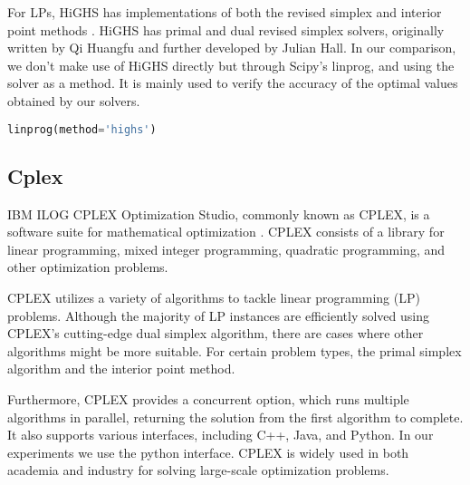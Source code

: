 For LPs, HiGHS has implementations of both the revised simplex and interior point methods
\parencite{Huangfu2018}.
HiGHS has primal and
dual revised simplex solvers, originally written by Qi Huangfu and
further developed by Julian Hall.
In our comparison, we don't make use of HiGHS directly but through Scipy's linprog, and using the solver as a method. It is mainly used to verify the accuracy of the optimal values
obtained by our solvers.

\begin{lstlisting}[language=Python]
    linprog(method='highs')
\end{lstlisting}

\subsection{Cplex}
IBM ILOG CPLEX Optimization Studio, commonly known as CPLEX,
is a software suite for mathematical optimization \parencite{cplex2009v12}.
CPLEX consists of a library for linear programming,
mixed integer programming, quadratic programming, and other optimization problems.

CPLEX utilizes a variety of algorithms to tackle linear programming (LP) problems.
Although the majority of LP instances are efficiently solved using CPLEX's
cutting-edge dual simplex algorithm, there are cases where other algorithms might be more suitable.
For certain problem types, the primal simplex algorithm and the interior point method.

Furthermore, CPLEX provides a concurrent option, which runs multiple algorithms in parallel,
returning the solution from the first algorithm to complete.
It also supports various interfaces, including C++, Java, and Python. In our experiments
we use the python interface.
CPLEX is widely used in both academia and industry for solving large-scale optimization
problems.
